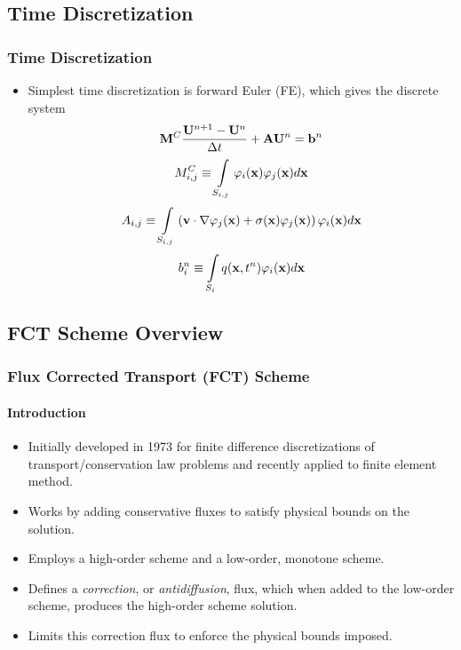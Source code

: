 \documentclass{beamer}
\begin{document}
\subsection{Time Discretization}
\begin{frame}
\frametitle{Time Discretization}

\begin{itemize}
   \item Simplest time discretization is forward Euler (FE), which gives the
      discrete system
   \begin{equation}
      \mathbf{M}^C\frac{\mathbf{U}^{n+1}-\mathbf{U}^n}{\Delta t} + \mathbf{A}\mathbf{U}^n = \mathbf{b}^n
   \end{equation}
   \begin{equation}
      M_{i,j}^C \equiv \int\limits_{S_{i,j}}\varphi_i(\mathbf{x}) \varphi_j(\mathbf{x}) d\mathbf{x}
   \end{equation}
   \begin{equation}
      A_{i,j} \equiv \int\limits_{S_{i,j}}\left(
      \mathbf{v}\cdot\nabla\varphi_j(\mathbf{x}) +
		\sigma(\mathbf{x})\varphi_j(\mathbf{x})\right)\varphi_i(\mathbf{x}) d\mathbf{x}
   \end{equation}
   \begin{equation}
      b_i^n \equiv \int\limits_{S_i} q(\mathbf{x},t^n)\varphi_i(\mathbf{x}) d\mathbf{x}
   \end{equation}
\end{itemize}

\end{frame}
\subsection{FCT Scheme Overview}
\begin{frame}
\frametitle{Flux Corrected Transport (FCT) Scheme}
\framesubtitle{Introduction}

\begin{itemize}
   \item Initially developed in 1973 for finite difference discretizations of
      transport/conservation law problems and recently applied to finite element
      method.
   \item Works by adding conservative fluxes to satisfy physical bounds on the
      solution.
   \item Employs a high-order scheme and a low-order, monotone scheme.
   \item Defines a \emph{correction}, or \emph{antidiffusion}, flux, which
      when added to the low-order scheme, produces the high-order scheme
      solution.
   \item Limits this correction flux to enforce the physical bounds imposed.
\end{itemize}

\end{frame}
\end{document}
